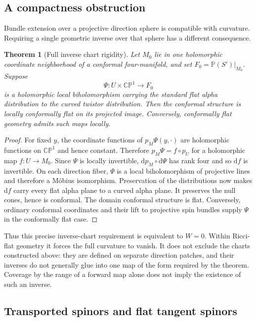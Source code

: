 \documentclass[11pt]{article}
\numberwithin{equation}{section}
\newtheorem{theorem}{Theorem}[section]
\theoremstyle{definition}
\theoremstyle{remark}
\newcommand{\CP}{\mathbb{CP}}
\newcommand{\dd}{\mathrm d}
\begin{document}
\subsection{A compactness obstruction}

Bundle extension over a projective direction sphere is compatible with curvature. Requiring a single geometric inverse over that sphere has a different consequence.

\begin{theorem}[Full inverse chart rigidity]\label{thm:rigidity}
Let $M_0$ lie in one holomorphic coordinate neighborhood of a conformal four-manifold, and set $F_0=\mathbb P(S')|_{M_0}$. Suppose
\[
\Psi:U\times\CP^1\longrightarrow F_0
\]
is a holomorphic local biholomorphism carrying the standard flat alpha distribution to the curved twistor distribution. Then the conformal structure is locally conformally flat on its projected image. Conversely, conformally flat geometry admits such maps locally.
\end{theorem}
\begin{proof}
For fixed $y$, the coordinate functions of $p_M\Psi(y,\cdot)$ are holomorphic functions on $\CP^1$ and hence constant. Therefore $p_M\Psi=f\circ p_U$ for a holomorphic map $f:U\to M_0$. Since $\Psi$ is locally invertible, $\dd p_M\circ\dd\Psi$ has rank four and so $\dd f$ is invertible. On each direction fiber, $\Psi$ is a local biholomorphism of projective lines and therefore a Möbius isomorphism. Preservation of the distributions now makes $\dd f$ carry every flat alpha plane to a curved alpha plane. It preserves the null cones, hence is conformal. The domain conformal structure is flat. Conversely, ordinary conformal coordinates and their lift to projective spin bundles supply $\Psi$ in the conformally flat case.
\end{proof}

Thus this precise inverse-chart requirement is equivalent to $W=0$. Within Ricci-flat geometry it forces the full curvature to vanish. It does not exclude the charts constructed above: they are defined on separate direction patches, and their inverses do not generally glue into one map of the form required by the theorem. Coverage by the range of a forward map alone does not imply the existence of such an inverse.

\subsection{Transported spinors and flat tangent spinors}
\end{document}
